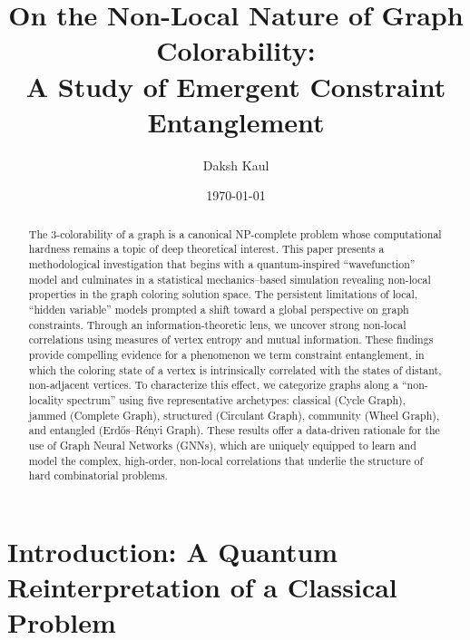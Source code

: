 \documentclass[12pt, letterpaper]{article}
\title{On the Non-Local Nature of Graph Colorability:\\A Study of Emergent Constraint Entanglement}
\author{Daksh Kaul}
\date{\today}
\begin{document}
\maketitle

\begin{abstract}
The 3-colorability of a graph is a canonical NP-complete problem whose computational hardness remains a topic of deep theoretical interest. This paper presents a methodological investigation that begins with a quantum-inspired “wavefunction” model and culminates in a statistical mechanics–based simulation revealing non-local properties in the graph coloring solution space. The persistent limitations of local, “hidden variable” models prompted a shift toward a global perspective on graph constraints. Through an information-theoretic lens, we uncover strong non-local correlations using measures of vertex entropy and mutual information. These findings provide compelling evidence for a phenomenon we term constraint entanglement, in which the coloring state of a vertex is intrinsically correlated with the states of distant, non-adjacent vertices. To characterize this effect, we categorize graphs along a “non-locality spectrum” using five representative archetypes: classical (Cycle Graph), jammed (Complete Graph), structured (Circulant Graph), community (Wheel Graph), and entangled (Erdős–Rényi Graph). These results offer a data-driven rationale for the use of Graph Neural Networks (GNNs), which are uniquely equipped to learn and model the complex, high-order, non-local correlations that underlie the structure of hard combinatorial problems.
\end{abstract}


\section{Introduction: A Quantum Reinterpretation of a Classical Problem}
\end{document}
